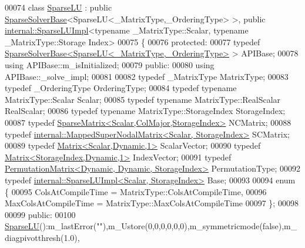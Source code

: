 \begin{DoxyCode}
00074 \textcolor{keyword}{class }\hyperlink{group___sparse_l_u___module_class_eigen_1_1_sparse_l_u}{SparseLU} : \textcolor{keyword}{public} \hyperlink{group___sparse_core___module_class_eigen_1_1_sparse_solver_base}{SparseSolverBase}<SparseLU<\_MatrixType,\_OrderingType> >, \textcolor{keyword}{
      public} \hyperlink{group___sparse_l_u___module_class_eigen_1_1internal_1_1_sparse_l_u_impl}{internal::SparseLUImpl}<typename \_MatrixType::Scalar, typename \_MatrixType::Storage
      Index>
00075 \{
00076   \textcolor{keyword}{protected}:
00077     \textcolor{keyword}{typedef} \hyperlink{group___sparse_core___module_class_eigen_1_1_sparse_solver_base}{SparseSolverBase<SparseLU<\_MatrixType,\_OrderingType>}
       > APIBase;
00078     \textcolor{keyword}{using} APIBase::m\_isInitialized;
00079   \textcolor{keyword}{public}:
00080     \textcolor{keyword}{using} APIBase::\_solve\_impl;
00081     
00082     \textcolor{keyword}{typedef} \_MatrixType MatrixType; 
00083     \textcolor{keyword}{typedef} \_OrderingType OrderingType;
00084     \textcolor{keyword}{typedef} \textcolor{keyword}{typename} MatrixType::Scalar Scalar; 
00085     \textcolor{keyword}{typedef} \textcolor{keyword}{typename} MatrixType::RealScalar RealScalar; 
00086     \textcolor{keyword}{typedef} \textcolor{keyword}{typename} MatrixType::StorageIndex StorageIndex;
00087     \textcolor{keyword}{typedef} \hyperlink{group___sparse_core___module}{SparseMatrix<Scalar,ColMajor,StorageIndex>} NCMatrix;
00088     \textcolor{keyword}{typedef} \hyperlink{group___sparse_l_u___module}{internal::MappedSuperNodalMatrix<Scalar, StorageIndex>}
       SCMatrix;
00089     \textcolor{keyword}{typedef} \hyperlink{group___core___module}{Matrix<Scalar,Dynamic,1>} ScalarVector;
00090     \textcolor{keyword}{typedef} \hyperlink{group___core___module}{Matrix<StorageIndex,Dynamic,1>} IndexVector;
00091     \textcolor{keyword}{typedef} \hyperlink{group___core___module}{PermutationMatrix<Dynamic, Dynamic, StorageIndex>}
       PermutationType;
00092     \textcolor{keyword}{typedef} \hyperlink{group___sparse_l_u___module_class_eigen_1_1internal_1_1_sparse_l_u_impl}{internal::SparseLUImpl<Scalar, StorageIndex>} Base;
00093 
00094     \textcolor{keyword}{enum} \{
00095       ColsAtCompileTime = MatrixType::ColsAtCompileTime,
00096       MaxColsAtCompileTime = MatrixType::MaxColsAtCompileTime
00097     \};
00098     
00099   \textcolor{keyword}{public}:
00100     \hyperlink{group___sparse_l_u___module_class_eigen_1_1_sparse_l_u}{SparseLU}():m\_lastError(\textcolor{stringliteral}{""}),m\_Ustore(0,0,0,0,0,0),m\_symmetricmode(false),m\_diagpivotthresh(1.0),

\end{DoxyCode}
